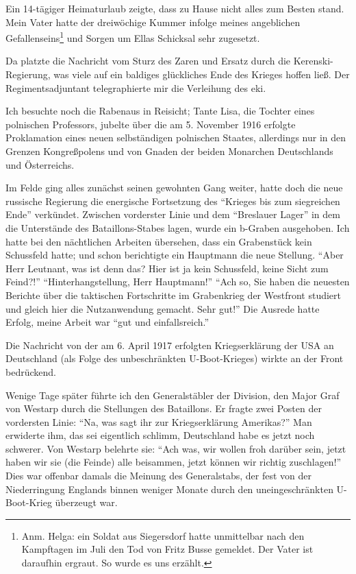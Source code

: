 Ein 14-tägiger Heimaturlaub zeigte, dass zu Hause nicht alles zum Besten stand. Mein Vater hatte der dreiwöchige Kummer infolge meines angeblichen Gefallenseins\footnote{Anm. Helga: ein Soldat aus Siegersdorf hatte unmittelbar nach den Kampftagen im Juli den Tod von Fritz Busse gemeldet. Der Vater ist daraufhin ergraut. So wurde es uns erzählt.} und Sorgen um Ellas Schicksal sehr zugesetzt.

Da platzte die Nachricht vom Sturz des Zaren und Ersatz durch die Kerenski-Regierung, was viele auf ein baldiges glückliches Ende des Krieges hoffen ließ. Der Regimentsadjuntant telegraphierte mir die Verleihung des \ac{eki}.

Ich besuchte noch die Rabenaus in Reisicht; Tante Lisa, die Tochter eines polnischen Professors, jubelte über die am 5. November 1916 erfolgte Proklamation eines neuen selbständigen polnischen Staates, allerdings nur in den Grenzen Kongreßpolens und von Gnaden der beiden Monarchen Deutschlands und Österreichs.

Im Felde ging alles zunächst seinen gewohnten Gang weiter, hatte doch die neue russische Regierung die energische Fortsetzung des \enquote{Krieges bis zum siegreichen Ende} verkündet. Zwischen vorderster Linie und dem \enquote{Breslauer Lager} in dem die Unterstände des Bataillons-Stabes lagen, wurde ein b-Graben ausgehoben. Ich hatte bei den nächtlichen Arbeiten übersehen, dass ein Grabenstück kein Schussfeld hatte; und schon berichtigte ein Hauptmann die neue Stellung. \enquote{Aber Herr Leutnant, was ist denn das? Hier ist ja kein Schussfeld, keine Sicht zum Feind?!} \enquote{Hinterhangstellung, Herr Hauptmann!} \enquote{Ach so, Sie haben die neuesten Berichte über die taktischen Fortschritte im Grabenkrieg der Westfront studiert und gleich hier die Nutzanwendung gemacht. Sehr gut!} Die Ausrede hatte Erfolg, meine Arbeit war \enquote{gut und einfallsreich.}

Die Nachricht von der am 6. April 1917 erfolgten Kriegserklärung der USA an Deutschland (als Folge des unbeschränkten U-Boot-Krieges) wirkte an der Front bedrückend.

Wenige Tage später führte ich den Generalstäbler der Division, den Major Graf von Westarp durch die Stellungen des Bataillons. Er fragte zwei Posten der vordersten Linie: \enquote{Na, was sagt ihr zur Kriegserklärung Amerikas?} Man erwiderte ihm, das sei eigentlich schlimm, Deutschland habe es jetzt noch schwerer. Von Westarp belehrte sie: \enquote{Ach was, wir wollen froh darüber sein, jetzt haben wir sie (die Feinde) alle beisammen, jetzt können wir richtig zuschlagen!} Dies war offenbar damals die Meinung des Generalstabs, der fest von der Niederringung Englands binnen weniger Monate durch den uneingeschränkten U-Boot-Krieg überzeugt war.

